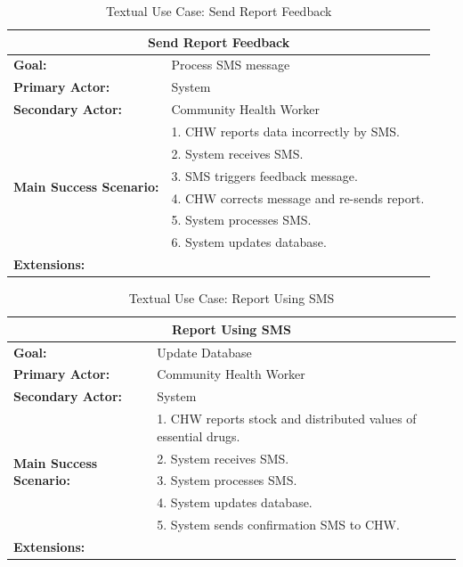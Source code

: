 \begin{table}
	\centering
	\begin{tabular}{|p{5cm}|p{7cm}|}
		\hline
		\multicolumn{2}{|c|}{\textbf{Send Report Feedback}} \\
		\hline
		\textbf{Goal:} & Process SMS message\\
		\hline
		\textbf{Primary Actor:} & System \\
		\hline
		\textbf{Secondary Actor:} & Community Health Worker \\
		\hline
		\multirow{6}{*}{\textbf{Main Success Scenario:}}	& 1. CHW reports data incorrectly by SMS. \\
																											& 2. System receives SMS. \\
																											& 3. SMS triggers feedback message. \\
																											& 4. CHW corrects message and re-sends report. \\
																											& 5. System processes SMS. \\
																											& 6. System updates database. \\
		\hline
		\textbf{Extensions:} & \\
		\hline
	\end{tabular}
	\caption{Textual Use Case: Send Report Feedback}
	\label{tab:feedback}
\end{table}

\begin{table}
	\centering
	\begin{tabular}{|p{5cm}|p{7cm}|}
		\hline
		\multicolumn{2}{|c|}{\textbf{Report Using SMS}}\\
		\hline
		\textbf{Goal:} & Update Database \\
		\hline
		\textbf{Primary Actor:} & Community Health Worker\\
		\hline
		\textbf{Secondary Actor:} & System \\
		\hline
		\multirow{5}{*}{\textbf{Main Success Scenario:}}	& 1. CHW reports stock and distributed values of essential drugs. \\
																											& 2. System receives SMS. \\
																											& 3. System processes SMS. \\
																											& 4. System updates database. \\
																											& 5. System sends confirmation SMS to CHW. \\
		\hline
		\textbf{Extensions:} & \\
		\hline
	\end{tabular}
	\caption{Textual Use Case: Report Using SMS}
	\label{tab:smsreport}
\end{table}

